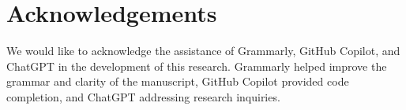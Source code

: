 \section{Acknowledgements}\label{sec:acknowledgements}

We would like to acknowledge the assistance of Grammarly, GitHub Copilot, and ChatGPT in the development of this research. Grammarly helped improve the grammar and clarity of the manuscript, GitHub Copilot provided code completion, and ChatGPT addressing research inquiries.